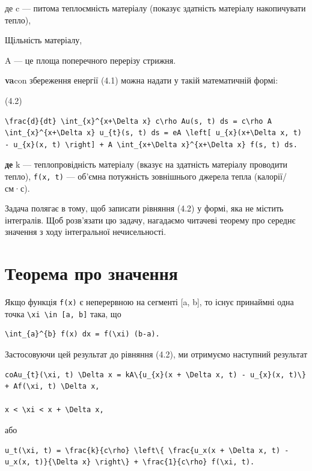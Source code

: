 \documentclass[
  ukrainian,
]{article}
\begin{document}
де c --- питома теплоємність матеріалу (показує здатність матеріалу
накопичувати тепло),

Щільність матеріалу,

A --- це площа поперечного перерізу стрижня.

\textbf{va}con збереження енергії (4.1) можна надати у такій
математичній формі:

(4.2)

\begin{verbatim}
\frac{d}{dt} \int_{x}^{x+\Delta x} c\rho Au(s, t) ds = c\rho A \int_{x}^{x+\Delta x} u_{t}(s, t) ds = eA \left[ u_{x}(x+\Delta x, t) - u_{x}(x, t) \right] + A \int_{x+\Delta x}^{x+\Delta x} f(s, t) ds.
\end{verbatim}

\textbf{де} k --- теплопровідність матеріалу (вказує на здатність
матеріалу проводити тепло), \texttt{f(x,\ t)} --- об'ємна потужність
зовнішнього джерела тепла (калорії/см·с).

Задача полягає в тому, щоб записати рівняння (4.2) у формі, яка не
містить інтегралів. Щоб розв'язати цю задачу, нагадаємо читачеві теорему
про середнє значення з ходу інтегральної нечисельності.

\section{Теорема про
значення}\label{ux442ux435ux43eux440ux435ux43cux430-ux43fux440ux43e-ux437ux43dux430ux447ux435ux43dux43dux44f}

Якщо функція \texttt{f(x)} є неперервною на сегменті {[}a, b{]}, то
існує принаймні одна точка
\texttt{\textbackslash{}xi\ \textbackslash{}in\ {[}a,\ b{]}} така, що

\begin{verbatim}
\int_{a}^{b} f(x) dx = f(\xi) (b-a).
\end{verbatim}

Застосовуючи цей результат до рівняння (4.2), ми отримуємо наступний
результат

\begin{verbatim}
coAu_{t}(\xi, t) \Delta x = kA\{u_{x}(x + \Delta x, t) - u_{x}(x, t)\} + Af(\xi, t) \Delta x,

x < \xi < x + \Delta x,
\end{verbatim}

або

\begin{verbatim}
u_t(\xi, t) = \frac{k}{c\rho} \left\{ \frac{u_x(x + \Delta x, t) - u_x(x, t)}{\Delta x} \right\} + \frac{1}{c\rho} f(\xi, t).
\end{verbatim}
\end{document}
